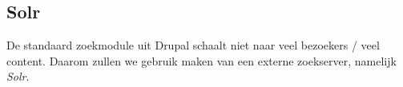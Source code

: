 \subsection{Solr}\label{solr}
De standaard zoekmodule uit Drupal schaalt niet naar veel bezoekers / veel content. Daarom zullen we gebruik maken van een externe zoekserver, namelijk \textit{Solr}. 
